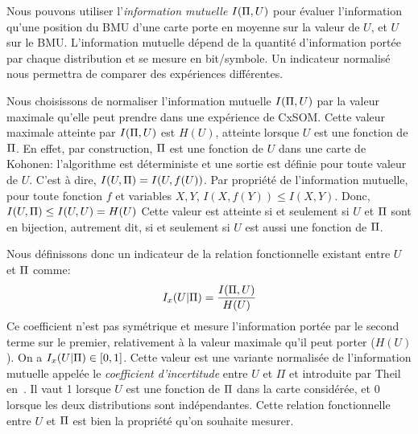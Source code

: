 \documentclass[../main]{subfiles}
\begin{document}
Nous pouvons utiliser l'\emph{information mutuelle} $I(\Pi, U)$ pour évaluer l'information qu'une position du BMU d'une carte porte en moyenne sur la valeur de $U$, et $U$ sur le BMU.
L'information mutuelle dépend de la quantité d'information portée par chaque distribution et se mesure en bit/symbole. Un indicateur normalisé nous permettra de comparer des expériences différentes. 

Nous choisissons de normaliser l'information mutuelle $I(\Pi,U)$  par la valeur maximale qu'elle peut prendre dans une expérience de CxSOM. Cette valeur maximale atteinte par $I(\Pi,U)$ est $H(U)$, atteinte lorsque $U$ est une fonction de $\Pi$.
En effet, par construction, $\Pi$ est une fonction de $U$ dans une carte de Kohonen: l'algorithme est déterministe et une sortie est définie pour toute valeur de $U$. C'est à dire, $I(U,\Pi) = I (U, f(U))$.
Par propriété de l'information mutuelle, pour toute fonction $f$ et variables $X,Y$, $I(X,f(Y)) \leq I(X,Y) $. 
Donc, $I(U,\Pi) \leq I(U,U) = H(U)$
Cette valeur est atteinte si et seulement si $U$ et $\Pi$ sont en bijection, autrement dit, si et seulement si $U$ est aussi une fonction de $\Pi$.

Nous définissons donc un indicateur de la relation fonctionnelle existant entre $U$ et $\Pi$ comme:
\begin{equation}
I_x(U|\Pi) = \frac{I(\Pi,U)}{H(U)}
\end{equation}
Ce coefficient n'est pas symétrique et mesure l'information portée par le second terme sur le premier, relativement à la valeur maximale qu'il peut porter ($H(U)$). On a $I_x(U|\Pi) \in [0,1]$. Cette valeur est une variante normalisée de l'information mutuelle appelée le \emph{coefficient d'incertitude} entre $U$ et $\Pi$ et introduite par Theil en~\cite{Theil1961EconomicFA}.
Il vaut 1 lorsque $U$ est une fonction de $\Pi$ dans la carte considérée, et $0$ lorsque les deux distributions sont indépendantes. Cette relation fonctionnelle entre $U$ et $\Pi$ est bien la propriété qu'on souhaite mesurer.



\end{document}
